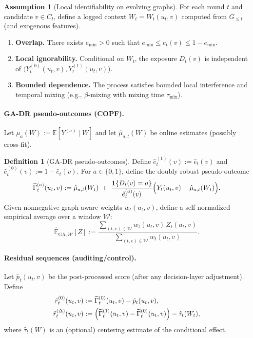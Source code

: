 \documentclass[11pt]{article}
\newcommand{\E}{\mathbb{E}}
\newcommand{\1}{\mathbf{1}}
\newcommand{\cW}{\mathcal{W}}
\newcommand{\Eb}{\widehat{\mathbb{E}}} %
\newcommand{\tGADR}{\widetilde{\Gamma}}
\theoremstyle{plain}
\theoremstyle{definition}
\newtheorem{definition}[theorem]{Definition}
\newtheorem{assumption}[theorem]{Assumption}
\theoremstyle{remark}
\begin{document}
\begin{assumption}[Local identifiability on evolving graphs]\label{ass:ident}
For each round $t$ and candidate $v\in C_t$, define a logged context $W_t=W_t(u_t,v)$
computed from $G_{\le t}$ (and exogenous features).
\begin{enumerate}[leftmargin=2em]
\item \textbf{Overlap.} There exists $e_{\min}>0$ such that $e_{\min}\le e_t(v)\le 1-e_{\min}$.
\item \textbf{Local ignorability.} Conditional on $W_t$, the exposure $D_t(v)$ is independent of
$\bigl(Y_t^{(0)}(u_t,v),Y_t^{(1)}(u_t,v)\bigr)$.
\item \textbf{Bounded dependence.} The process satisfies bounded local interference and temporal mixing
(e.g., $\beta$-mixing with mixing time $\tau_{\mathrm{mix}}$).
\end{enumerate}
\end{assumption}

\paragraph{GA-DR pseudo-outcomes (COPF).}
Let $\mu_a(W):=\E[Y^{(a)}\mid W]$ and let $\hat\mu_{a,t}(W)$ be online estimates (possibly cross-fit).

\begin{definition}[GA-DR pseudo-outcomes]\label{def:gadr}
Define $\hat e_t^{(1)}(v):=\hat e_t(v)$ and $\hat e_t^{(0)}(v):=1-\hat e_t(v)$.
For $a\in\{0,1\}$, define the doubly robust pseudo-outcome
\[
\tGADR_t^{(a)}(u_t,v)
:=\hat\mu_{a,t}(W_t)\;+\;\frac{\1\{D_t(v)=a\}}{\hat e_t^{(a)}(v)}
\Bigl(Y_t(u_t,v)-\hat\mu_{a,t}(W_t)\Bigr).
\]
Given nonnegative graph-aware weights $w_t(u_t,v)$, define a self-normalized empirical average over a window $\cW$:
\[
\Eb_{\mathrm{GA},\cW}[Z]
:=\frac{\sum_{(t,v)\in\cW} w_t(u_t,v)\,Z_t(u_t,v)}{\sum_{(t,v)\in\cW} w_t(u_t,v)}.
\]
\end{definition}

\paragraph{Residual sequences (auditing/control).}
Let $\hat p_t(u_t,v)$ be the post-processed score (after any decision-layer adjustment).
Define
\begin{align*}
\hat r_t^{(0)}(u_t,v) &:= \tGADR_t^{(0)}(u_t,v) - \hat p_t(u_t,v),\\
\hat r_t^{(\Delta)}(u_t,v) &:= \Bigl(\tGADR_t^{(1)}(u_t,v)-\tGADR_t^{(0)}(u_t,v)\Bigr) - \hat\tau_t(W_t),
\end{align*}
where $\hat\tau_t(W)$ is an (optional) centering estimate of the conditional effect.
\end{document}
